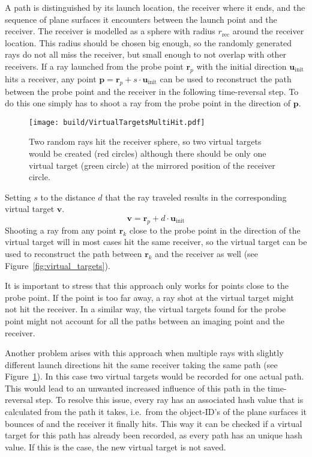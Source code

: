 A path is distinguished by its launch location, the receiver where it ends, and the sequence of plane surfaces it encounters between the launch point and the receiver.
The receiver is modelled as a sphere with radius \(r_{\text{rec}}\) around the receiver location.
This radius should be chosen big enough, so the randomly generated rays do not all miss the receiver, but small enough to not overlap with other receivers.
If a ray launched from the probe point \(\bm{r}_p\) with the initial direction \(\bm{u}_{\text{init}}\) hits a receiver, any point \(\bm{p} = \bm{r}_p + s \cdot \bm{u}_{\text{init}}\) can be used to reconstruct the path between the probe point and the receiver in the following time-reversal step.
To do this one simply has to shoot a ray from the probe point in the direction of \(\bm{p}\).

\begin{figure}
    \centering
    \texttt{[image: build/VirtualTargetsMultiHit.pdf]}
    \caption{Two random rays hit the receiver sphere, so two virtual targets would be created (red circles) although there should be only one virtual target (green circle) at the mirrored position of the receiver circle.}\label{fig:mulithit}
\end{figure}

Setting \(s\) to the distance \(d\) that the ray traveled results in the corresponding virtual target \(\bm{v}\).
\begin{equation}\label{eq:visual_target}
    \bm{v} = \bm{r}_p + d \cdot \bm{u}_{\text{init}}
\end{equation}
Shooting a ray from any point \(\bm{r}_k\) close to the probe point in the direction of the virtual target will in most cases hit the same receiver, so the virtual target can be used to reconstruct the path between \(\bm{r}_k\) and the receiver as well  (see Figure~\ref{fig:virtual_targets}).

It is important to stress that this approach only works for points close to the probe point.
If the point is too far away, a ray shot at the virtual target might not hit the receiver.
In a similar way, the virtual targets found for the probe point might not account for all the paths between an imaging point and the receiver.

Another problem arises with this approach when multiple rays with slightly different launch directions hit the same receiver taking the same path (see Figure~\ref{fig:mulithit}).
In this case two virtual targets would be recorded for one actual path.
This would lead to an unwanted increased influence of this path in the time-reversal step.
To resolve this issue, every ray has an associated hash value that is calculated from the path it takes, i.e.~from the object-ID's of the plane surfaces it bounces of and the receiver it finally hits.
This way it can be checked if a virtual target for this path has already been recorded, as every path has an unique hash value.
If this is the case, the new virtual target is not saved.

